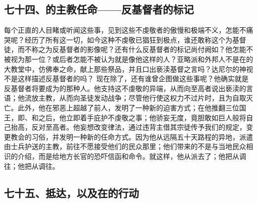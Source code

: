 
\subsection{七十四、的主教任命——反基督者的标记}

每个正直的人目睹或听闻这些事，见到这些不虔敬者的傲慢和极端不义，怎能不痛哭呢？经历了所有这一切，如今这种不虔敬已猖狂到极点，谁还敢称这个为基督徒，而不称之为反基督者的影像呢？还有什么反基督者的标记尚付阙如？他怎能不被视为那一位？或后者怎能不被认为就是像他这样的人？亚略派和外邦人不是在的大教堂中，仿佛奉之命，献上那些祭品，并且口出亵渎基督之言吗？达尼尔的神视不是这样描述反基督者的吗？ 现在除了，还有谁曾企图做这些事呢？他确实就是反基督者将要成为的那种人。他支持这不虔敬的异端，从而向至高者说出亵渎的言语；他流放主教，从而向圣徒发动战争；尽管他行使这权力不过片时，且为自取灭亡。此外，他在邪恶上超越了前人，发明了一种新的迫害方式；在他推翻三位国王，即、和之后，他立即着手庇护不虔敬之事；他骄妄无度，竟胆敢如巨人般将自己抬高，反对至高者。他妄想改变律法，通过违背主借其宗徒传予我们的规定，变更教会的习俗，并发明一种新的任命方式。因为他从远隔五十天路程的异地，派遣由士兵护送的主教，前往不愿接受他们的民众那里；他们带来的不是与当地民众相识的介绍，而是给地方长官的恐吓信函和命令。就这样，他从派去了；他把从调往；他把从调往。\par


\subsection{七十五、抵达，以及在的行动}

